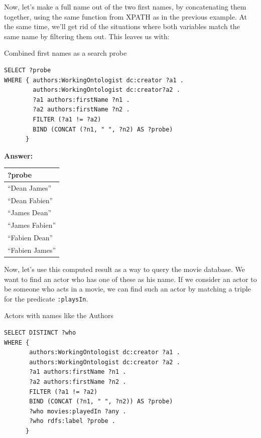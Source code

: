Now, let's make a full name out of the two first names, by concatenating
them together, using the same function from XPATH as in the previous
example. At the same time, we'll get rid of the situations where both
variables match the same name by filtering them out. This leaves us
with:

\begin{query}Combined first names as a search probe\end{query}

\begin{lstlisting}
SELECT ?probe
WHERE { authors:WorkingOntologist dc:creator ?a1 .
        authors:WorkingOntologist dc:creator?a2 .
        ?a1 authors:firstName ?n1 .
        ?a2 authors:firstName ?n2 .
        FILTER (?a1 != ?a2)
        BIND (CONCAT (?n1, " ", ?n2) AS ?probe)
      }

\end{lstlisting}


\textbf{\textbf{Answer:}}

\begin{tabular} {|l|}
\hline
?probe\\
\hline
``Dean James''\\
``Dean Fabien''\\
``James Dean''\\
``James Fabien''\\
``Fabien Dean''\\
``Fabien James''\\
\hline
\end{tabular}

Now, let's use this computed result as a way to query the movie
database. We want to find an actor who has one of these as his name. If
we consider an actor to be someone who acts in a movie, we can find such
an actor by matching a triple for the predicate \texttt{:playsIn}.

\begin{query}Actors with names like the Authors\end{query}

\begin{lstlisting}
SELECT DISTINCT ?who
WHERE {
       authors:WorkingOntologist dc:creator ?a1 . 
       authors:WorkingOntologist dc:creator ?a2 .
       ?a1 authors:firstName ?n1 .
       ?a2 authors:firstName ?n2 .
       FILTER (?a1 != ?a2)
       BIND (CONCAT (?n1, " ", ?n2)) AS ?probe)
       ?who movies:playedIn ?any .
       ?who rdfs:label ?probe .
      }
\end{lstlisting}


